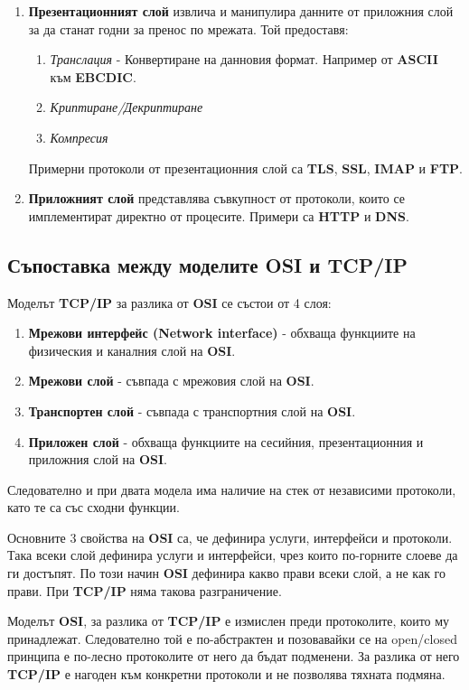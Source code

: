 \documentclass[fleqn,12pt]{article}
\begin{document}
\begin{flushleft}
\begin{enumerate}
    \item \textbf{Презентационният слой} извлича и манипулира данните от приложния слой за да станат годни за пренос по мрежата. Той предоставя:
    \begin{enumerate}
        \item \textit{Транслация} - Конвертиране на данновия формат. Например от \textbf{ASCII} към \textbf{EBCDIC}.
        \item \textit{Криптиране/Декриптиране}
        \item \textit{Компресия}
    \end{enumerate}
    Примерни протоколи от презентационния слой са \textbf{TLS}, \textbf{SSL}, \textbf{IMAP} и \textbf{FTP}.
    \item \textbf{Приложният слой} представлява съвкупност от протоколи, които се имплементират директно от процесите. Примери са \textbf{HTTP} и \textbf{DNS}.
\end{enumerate}

\subsection{Съпоставка между моделите OSI и TCP/IP}

Моделът \textbf{TCP/IP} за разлика от \textbf{OSI} се състои от 4 слоя:
\begin{enumerate}
    \item \textbf{Мрежови интерфейс (Network interface)} - обхваща функциите на физическия и каналния слой на \textbf{OSI}.
    \item \textbf{Мрежови слой} - съвпада с мрежовия слой на \textbf{OSI}.
    \item \textbf{Транспортен слой} - съвпада с транспортния слой на \textbf{OSI}.
    \item \textbf{Приложен слой} - обхваща функциите на сесийния, презентационния и приложния слой на \textbf{OSI}.
\end{enumerate}

Следователно и при двата модела има наличие на стек от независими протоколи, като те са със сходни функции.

Основните 3 свойства на \textbf{OSI} са, че дефинира услуги, интерфейси и протоколи. Така всеки слой дефинира услуги и интерфейси, чрез които по-горните слоеве да ги достъпят.
По този начин \textbf{OSI} дефинира какво прави всеки слой, а не как го прави. При \textbf{TCP/IP} няма такова разграничение.

Моделът \textbf{OSI}, за разлика от \textbf{TCP/IP} е измислен преди протоколите, които му принадлежат.
Следователно той е по-абстрактен и позовавайки се на open/closed принципа е по-лесно протоколите от него да бъдат подменени.
За разлика от него \textbf{TCP/IP} е нагоден към конкретни протоколи и не позволява тяхната подмяна.


\end{flushleft}
\end{document}
